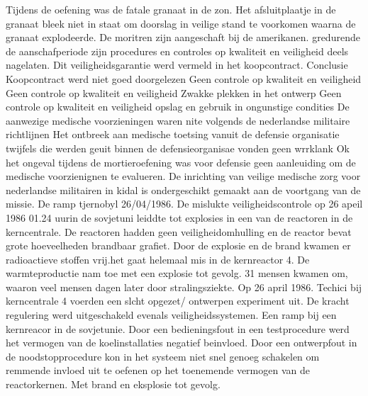 Tijdens de oefening was de fatale granaat in de zon.
Het afsluitplaatje in de granaat bleek niet in staat om doorslag in veilige stand te voorkomen waarna de granaat explodeerde.
De moritren zijn aangeschaft bij de amerikanen. gredurende de aanschafperiode zijn procedures en controles op kwaliteit en veiligheid deels nagelaten.
Dit veiligheidsgarantie werd vermeld in het koopcontract.
Conclusie
Koopcontract werd niet goed doorgelezen
Geen controle op kwaliteit en veiligheid
Geen controle op kwaliteit en veiligheid
Zwakke plekken in het ontwerp
Geen controle op kwaliteit en veiligheid
opslag en gebruik in ongunstige condities
De aanwezige medische voorzieningen waren nite volgends de nederlandse militaire richtlijnen
Het ontbreek aan medische toetsing vanuit de defensie organisatie
twijfels die werden geuit binnen de defensieorganisae vonden geen wrrklank
Ok het ongeval tijdens de mortieroefening was voor defensie geen aanleuiding om de medische voorzienignen te evalueren.
De inrichting van veilige medische zorg voor nederlandse militairen in kidal is ondergeschikt gemaakt aan de voortgang van de missie.
\cite{ovvMortierOngevalMaliVideo} 
\cite{bnnvara13062018malirapport}
\cite{eucal11012021malimissieverlengd}
\cite{nos21052014zorgenmalimissie}
\cite{meijnders}
\cite{bnrwebredactie}
\cite{keultjes01062016malimissiecoalitie}
\cite{veenhof18012019}
\cite{isitman06012016militair}
\cite{nporadio11072016filmdemissie}
\cite{parlementairmonitor15122013mortierongeluk}
\newline \indent De ramp tjernobyl 26/04/1986. \cite{INSAVienna1992Chernobyl}
De mislukte veiligheidscontrole op 26 apeil 1986 01.24 uurin de sovjetuni leiddte tot explosies in een van de reactoren in de kerncentrale. De reactoren hadden geen veiligheidomhulling en de reactor bevat grote hoeveelheden brandbaar grafiet.
Door de explosie en de brand kwamen er radioactieve stoffen vrij.het gaat helemaal mis in de kernreactor 4. De warmteproductie nam  toe met een explosie tot gevolg.
31 mensen kwamen om, waaron veel mensen dagen later door stralingsziekte.
 Op 26 april 1986. Techici bij kerncentrale 4 voerden een slcht opgezet/ ontwerpen experiment uit. De  kracht regulering werd uitgeschakeld evenals veiligheidssystemen. 
Een ramp bij een kernreacor in de sovjetunie. Door een bedieningsfout in een testprocedure werd het vermogen van de koelinstallaties negatief beinvloed. Door een ontwerpfout in de noodstopprocedure kon in het systeem niet snel genoeg schakelen om remmende invloed uit te oefenen op het toenemende vermogen van de reactorkernen. Met brand en eksplosie tot gevolg.
